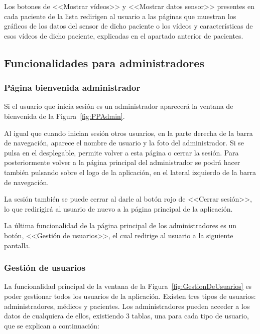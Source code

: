     Los botones de <<Mostrar vídeos>> y <<Mostrar datos sensor>> presentes en cada paciente de la lista redirigen al usuario a las páginas que muestran los gráficos de los datos del sensor de dicho paciente o los vídeos y características de esos vídeos de dicho paciente, explicadas en el apartado anterior de pacientes.


    
\subsection{Funcionalidades para administradores}
    \subsubsection{Página bienvenida administrador}
    Si el usuario que inicia sesión es un administrador aparecerá la ventana de bienvenida de la Figura~\ref{fig:PPAdmin}.
    
    Al igual que cuando inician sesión otros usuarios, en la parte derecha de la barra de navegación, aparece el nombre de usuario y la foto del administrador. Si se pulsa en el desplegable, permite volver a esta página o cerrar la sesión. Para posteriormente volver a la página principal del administrador se podrá hacer también pulsando sobre el logo de la aplicación, en el lateral izquierdo de la barra de navegación.

    La sesión también se puede cerrar al darle al botón rojo de <<Cerrar sesión>>, lo que redirigirá al usuario de nuevo a la página principal de la aplicación.

    La última funcionalidad de la página principal de los administradores es un botón, <<Gestión de usuarios>>, el cual redirige al usuario a la siguiente pantalla.
    
    \subsubsection{Gestión de usuarios}
    La funcionalidad principal de la ventana de la Figura~\ref{fig:GestionDeUsuarios} es poder gestionar todos los usuarios de la aplicación. Existen tres tipos de usuarios: administradores, médicos y pacientes.
    Los administradores pueden acceder a los datos de cualquiera de ellos, existiendo 3 tablas, una para cada tipo de usuario, que se explican a continuación:

